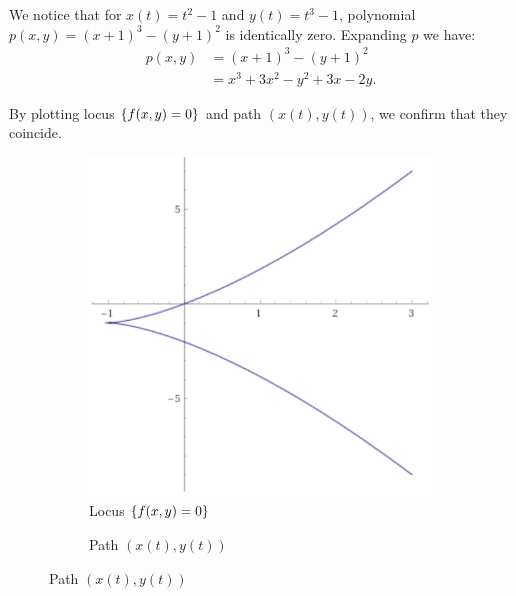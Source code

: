 \documentclass{article}
\theoremstyle{definition}
\DeclarePairedDelimiter\set{\{}{\}}
\begin{document}
We notice that for $x(t) = t^2-1$ and $y(t) = t^3-1$, polynomial $p(x,y) = (x+1)^3 - (y+1)^2$ is identically zero. Expanding $p$ we have:
\begin{align*}
    p(x,y) 
    & = (x+1)^3 - (y+1)^2 \\
    & = x^3 + 3 x^2 - y^2 + 3 x - 2 y.
\end{align*}

By plotting locus $\set{f(x,y)=0}$ and path $(x(t),y(t))$, we confirm that they coincide.
\begin{figure}[h]
    \centering
    \begin{subfigure}{0.4 \textwidth}
        \centering
        \caption{Locus $\set{f(x,y)=0}$}
        \includegraphics[scale=0.5]{xy}
    \end{subfigure}
    \begin{subfigure}{0.5 \textwidth}
        \centering
        \caption{Path $(x(t),y(t))$}

\end{subfigure}
\end{figure}
\end{document}
